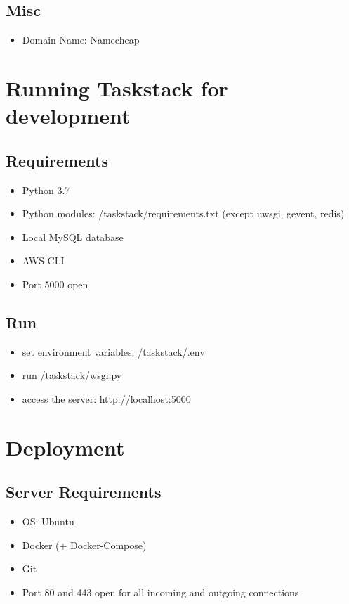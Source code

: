\documentclass[a4paper, 12pt]{article}
\begin{document}
\subsection{Misc}

\begin{itemize}
    \item Domain Name: Namecheap
\end{itemize}

\newpage

\section{Running Taskstack for development}

\subsection{Requirements}

\begin{itemize}
    \item Python 3.7 
    \item Python modules: /taskstack/requirements.txt (except uwsgi, gevent, redis)
    \item Local MySQL database
    \item AWS CLI
    \item Port 5000 open
\end{itemize}

\subsection{Run}

\begin{itemize}
    \item set environment variables: /taskstack/.env
    \item run /taskstack/wsgi.py
    \item access the server: http://localhost:5000
\end{itemize}

\section{Deployment}

\subsection{Server Requirements}

\begin{itemize}
    \item OS: Ubuntu
    \item Docker (+ Docker-Compose)
    \item Git
    \item Port 80 and 443 open for all incoming and outgoing connections
\end{itemize}
\end{document}
